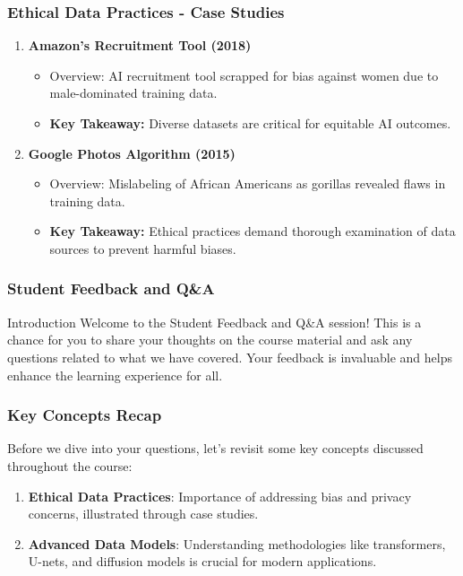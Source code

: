 \documentclass[aspectratio=169]{beamer}
\begin{document}
\begin{frame}[fragile]
    \frametitle{Ethical Data Practices - Case Studies}
    \begin{enumerate}
        \item \textbf{Amazon's Recruitment Tool (2018)}
            \begin{itemize}
                \item Overview: AI recruitment tool scrapped for bias against women due to male-dominated training data.
                \item \textbf{Key Takeaway:} Diverse datasets are critical for equitable AI outcomes.
            \end{itemize}

        \item \textbf{Google Photos Algorithm (2015)}
            \begin{itemize}
                \item Overview: Mislabeling of African Americans as gorillas revealed flaws in training data.
                \item \textbf{Key Takeaway:} Ethical practices demand thorough examination of data sources to prevent harmful biases.
            \end{itemize}
    \end{enumerate}
\end{frame}

\begin{frame}[fragile]
    \frametitle{Student Feedback and Q\&A}
    \begin{block}{Introduction}
        Welcome to the Student Feedback and Q\&A session! 
        This is a chance for you to share your thoughts on the course material and ask any questions related to what we have covered. Your feedback is invaluable and helps enhance the learning experience for all.
    \end{block}
\end{frame}

\begin{frame}[fragile]
    \frametitle{Key Concepts Recap}
    Before we dive into your questions, let’s revisit some key concepts discussed throughout the course:
    \begin{enumerate}
        \item \textbf{Ethical Data Practices}: Importance of addressing bias and privacy concerns, illustrated through case studies.
        \item \textbf{Advanced Data Models}: Understanding methodologies like transformers, U-nets, and diffusion models is crucial for modern applications.
    \end{enumerate}
\end{frame}
\end{document}
